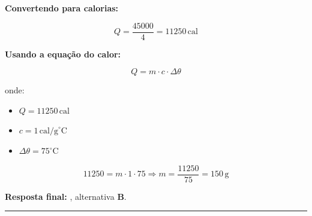 \documentclass[a4paper,12pt]{article}
\begin{document}
\begin{flushleft}
\textbf{Convertendo para calorias:}

\[
Q = \frac{45000}{4} = 11250\,\text{cal}
\]

\textbf{Usando a equação do calor:}

\[
\boxed{
Q = m \cdot c \cdot \Delta \theta
}
\]

onde:

\begin{itemize}
    \item $Q = 11250\,\text{cal}$
    \item $c = 1\,\text{cal/g}^\circ\text{C}$
    \item $\Delta \theta = 75^\circ\text{C}$
\end{itemize}

\[
11250 = m \cdot 1 \cdot 75 \Rightarrow m = \frac{11250}{75} = \boxed{150\,\text{g}}
\]

\vspace{0.3cm}
\textbf{Resposta final:} , alternativa \colorbox{green!50}{\textbf{B}}.

\end{flushleft}

\noindent\rule{\linewidth}{0.6pt}\\
\end{document}
